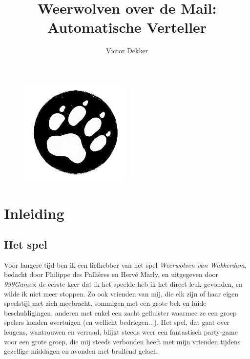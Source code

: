 \documentclass[12pt]{article}
\author{Victor Dekker}
\title{Weerwolven over de Mail:\\Automatische Verteller}
\begin{document}
\titlespacing{\subsubsection}{0in}{0.2in}{0in}

\maketitle

\begin{figure}[h!]
  \centering
  \includegraphics[width=0.5\textwidth]{Welp2.png}
\end{figure}

\newpage
\tableofcontents
\newpage

\section{Inleiding}

  \subsection{Het spel}

    Voor langere tijd ben ik een liefhebber van het spel \emph{Weerwolven van Wakkerdam}, bedacht door Philippe des Palli\`eres en Herv\'e Marly, en uitgegeven door \emph{999Games}; de eerste keer dat ik het speelde heb ik het direct leuk gevonden, en wilde ik niet meer stoppen. Zo ook vrienden van mij, die elk zijn of haar eigen speelstijl met zich meebracht, sommigen met een grote bek en luide beschuldigingen, anderen met enkel een zacht gefluister waarmee ze een groep spelers konden overtuigen (en wellicht bedriegen...). Het spel, dat gaat over leugens, wantrouwen en verraad, blijkt steeds weer een fantastisch party-game voor een grote groep, die mij steeds verbonden heeft met mijn vrienden tijdens gezellige middagen en avonden met brullend gelach.
\end{document}
